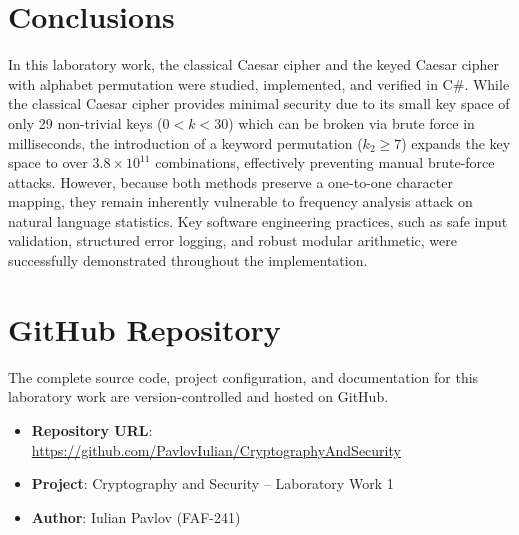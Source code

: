 \documentclass[12pt,a4paper]{article}
\begin{document}
\section{Conclusions}

In this laboratory work, the classical Caesar cipher and the keyed Caesar cipher with alphabet permutation were studied, implemented, and verified in C\#. While the classical Caesar cipher provides minimal security due to its small key space of only 29 non-trivial keys ($0 < k < 30$) which can be broken via brute force in milliseconds, the introduction of a keyword permutation ($k_2 \ge 7$) expands the key space to over $3.8 \times 10^{11}$ combinations, effectively preventing manual brute-force attacks. However, because both methods preserve a one-to-one character mapping, they remain inherently vulnerable to frequency analysis attack on natural language statistics. Key software engineering practices, such as safe input validation, structured error logging, and robust modular arithmetic, were successfully demonstrated throughout the implementation.

\section{GitHub Repository}

The complete source code, project configuration, and documentation for this laboratory work are version-controlled and hosted on GitHub.

\begin{itemize}
    \item \textbf{Repository URL}: \url{https://github.com/PavlovIulian/CryptographyAndSecurity}
    \item \textbf{Project}: Cryptography and Security -- Laboratory Work 1
    \item \textbf{Author}: Iulian Pavlov (FAF-241)
\end{itemize}
\end{document}
